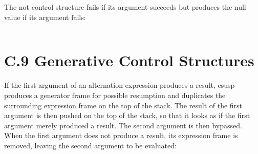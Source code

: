 The not control structure fails if its argument succeeds but produces
the null value if its argument fails:

\begin{center}
\tabletail{}
\tablelasttail{}
\begin{supertabular}{|m{1.9073598in}|m{2.75596in}|}

\end{supertabular}
\end{center}


\section[C.9 Generative Control Structures]{C.9 Generative Control Structures}

If the first argument of an alternation expression produces a result,
esusp produces a generator frame for possible resumption and
duplicates the surrounding expression frame on the top of the
stack. The result of the first argument is then pushed on the top of
the stack, so that it looks as if the first argument merely produced a
result. The second argument is then bypassed. When the first argument
does not produce a result, its expression frame is removed, leaving
the second argument to be evaluated:

